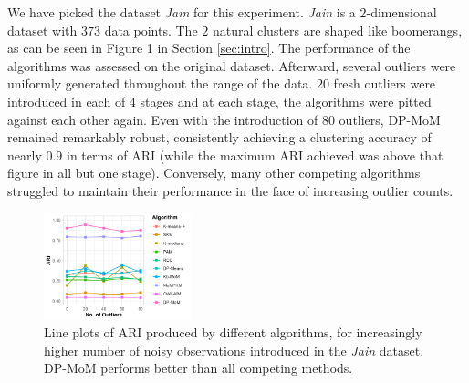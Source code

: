 \documentclass{article}
\begin{document}
We have picked the dataset \textit{Jain} \cite{jain-dataset} for this experiment. \textit{Jain} is a $2$-dimensional dataset with $373$ data points. The $2$ natural clusters are shaped like boomerangs, as can be seen in Figure 1 in Section \ref{sec:intro}. The performance of the algorithms was assessed on the original dataset. Afterward, several outliers were uniformly generated throughout the range of the data. $20$ fresh outliers were introduced in each of $4$ stages and at each stage, the algorithms were pitted against each other again. Even with the introduction of $80$ outliers, DP-MoM remained remarkably robust, consistently achieving a clustering accuracy of nearly $0.9$ in terms of ARI  (while the maximum ARI achieved was above that figure in all but one stage). Conversely, many other competing algorithms struggled to maintain their performance in the face of increasing outlier counts. 

\begin{figure}[!htb]
    \centering
    \includegraphics[width=0.38\textwidth]{Diagrams/plot-ari-jain-light-0.6.png}
    \caption{Line plots of ARI produced by different algorithms, for increasingly higher number of noisy observations introduced in the \textit{Jain} dataset. DP-MoM performs better than all competing methods.}
    \label{fig:plot-jain-ari}
\end{figure}
\end{document}
